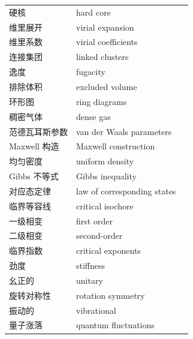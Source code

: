 \begin{xltabular}{\textwidth}{@{}l l c@{}}
  硬核 & {\glossaryfont hard core} & \pageref{term:5.hard-core} \\
  维里展开 & {\glossaryfont virial expansion} & \pageref{term:5.virial-expansion} \\
  维里系数 & {\glossaryfont virial coefficients} & \pageref{term:5.virial-coefficients} \\
  连接集团 & {\glossaryfont linked clusters} & \pageref{term:5.linked-cluster} \\
  逸度 & {\glossaryfont fugacity} & \pageref{term:5.fugacity} \\
  排除体积 & {\glossaryfont excluded volume} & \pageref{term:5.excluded-volume} \\
  环形图 & {\glossaryfont ring diagrams} & \pageref{term:5.ring-diagrams} \\
  稠密气体 & {\glossaryfont dense gas} & \pageref{term:5.dense-gas} \\
  范德瓦耳斯参数 & {\glossaryfont van der Waals parameters} & \pageref{term:5.van-der-waals-params} \\
  Maxwell 构造 & {\glossaryfont Maxwell construction} & \pageref{term:5.maxwell-construction} \\
  均匀密度 & {\glossaryfont uniform density} & \pageref{term:5.uniform-density} \\
  Gibbs 不等式 & {\glossaryfont Gibbs inequality} & \pageref{term:5.gibbs-inequality} \\
  对应态定律 & {\glossaryfont law of corresponding states} & \pageref{term:5.corresponding-states} \\
  临界等容线 & {\glossaryfont critical isochore} & \pageref{term:5.critical-isochore} \\
  一级相变 & {\glossaryfont first order} & \pageref{term:5.first-order} \\
  二级相变 & {\glossaryfont second-order} & \pageref{term:5.second-order} \\
  临界指数 & {\glossaryfont critical exponents} & \pageref{term:5.critical-exponents} \\
  劲度 & {\glossaryfont stiffness} & \pageref{term:6.stiffness} \\
  幺正的 & {\glossaryfont unitary} & \pageref{term:6.unitary} \\
  旋转对称性 & {\glossaryfont rotation symmetry} & \pageref{term:6.rotation-symmetry} \\
  振动的 & {\glossaryfont vibrational} & \pageref{term:6.vibrational} \\
  量子涨落 & {\glossaryfont quantum fluctuations} & \pageref{term:6.quantum-fluctuations} \\

\end{xltabular}
